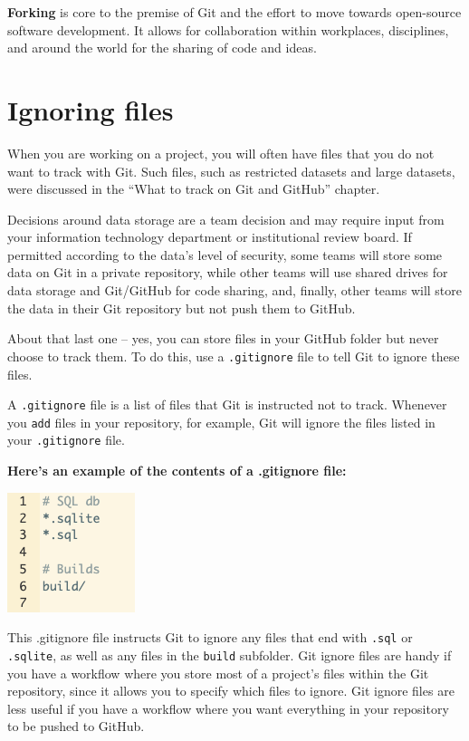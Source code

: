 \documentclass[
]{book}
\begin{document}
\textbf{Forking} is core to the premise of Git and the effort to move towards open-source software development. It allows for collaboration within workplaces, disciplines, and around the world for the sharing of code and ideas.

\section{Ignoring files}\label{ignoring-files}

When you are working on a project, you will often have files that you do not
want to track with Git. Such files, such as restricted datasets and large
datasets, were discussed in the ``What to track on Git and GitHub'' chapter.

Decisions around data storage are a team decision and may require input from
your information technology department or institutional review board. If
permitted according to the data's level of security, some teams will store some
data on Git in a private repository, while other teams will use shared drives for
data storage and Git/GitHub for code sharing, and, finally, other teams will store
the data in their Git repository but not push them to GitHub.

About that last one -- yes, you can store files in your GitHub folder but never
choose to track them. To do this, use a \texttt{.gitignore} file to tell Git to ignore
these files.

A \texttt{.gitignore} file is a list of files that Git is instructed not to track.
Whenever you \texttt{add} files in your repository, for example, Git will ignore the
files listed in your \texttt{.gitignore} file.

\textbf{Here's an example of the contents of a .gitignore file:}

\includegraphics[width=0.25\linewidth]{./figures/gitignore}

This .gitignore file instructs Git to ignore any files that end with \texttt{.sql} or \texttt{.sqlite}, as
well as any files in the \texttt{build} subfolder. Git ignore files are handy if
you have a workflow where you store most of a project's files within the Git
repository, since it allows you to specify which files to ignore. Git ignore
files are less useful if you have a workflow
where you want everything in your repository to be pushed to GitHub.
\end{document}
